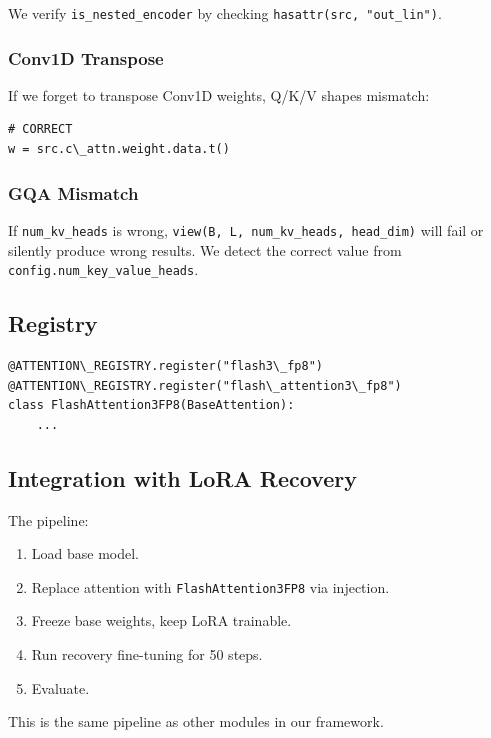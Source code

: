 We verify \texttt{is\_nested\_encoder} by checking \texttt{hasattr(src, "out\_lin")}.

\subsubsection{Conv1D Transpose}

If we forget to transpose Conv1D weights, Q/K/V shapes mismatch:

\begin{lstlisting}
# CORRECT
w = src.c\_attn.weight.data.t()
\end{lstlisting}

\subsubsection{GQA Mismatch}

If \texttt{num\_kv\_heads} is wrong, \texttt{view(B, L, num\_kv\_heads, head\_dim)} will fail 
or silently produce wrong results. We detect the correct value from 
\texttt{config.num\_key\_value\_heads}.

\subsection{Registry}

\begin{lstlisting}
@ATTENTION\_REGISTRY.register("flash3\_fp8")
@ATTENTION\_REGISTRY.register("flash\_attention3\_fp8")
class FlashAttention3FP8(BaseAttention):
    ...
\end{lstlisting}

\subsection{Integration with LoRA Recovery}

The pipeline:

\begin{enumerate}
\item Load base model.
\item Replace attention with \texttt{FlashAttention3FP8} via injection.
\item Freeze base weights, keep LoRA trainable.
\item Run recovery fine-tuning for 50 steps.
\item Evaluate.

\end{enumerate}
This is the same pipeline as other modules in our framework.



